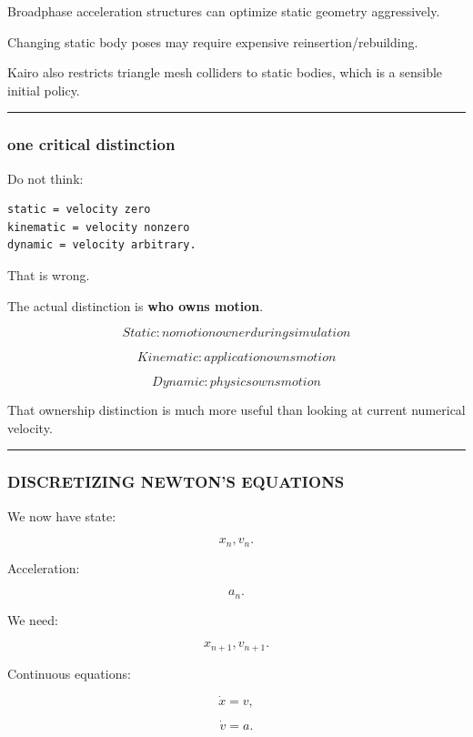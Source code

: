 Broadphase acceleration structures can optimize static geometry aggressively.

Changing static body poses may require expensive reinsertion/rebuilding.

Kairo also restricts triangle mesh colliders to static bodies, which is a sensible initial policy.

\begin{center}\rule{0.5\linewidth}{0.5pt}\end{center}

\subsubsection{one critical distinction}\label{one-critical-distinction}

Do not think:

\begin{verbatim}
static = velocity zero
kinematic = velocity nonzero
dynamic = velocity arbitrary.
\end{verbatim}

That is wrong.

The actual distinction is \textbf{who owns motion}.

\[
\boxed{
Static:
no motion owner during simulation
}
\]

\[
\boxed{
Kinematic:
application owns motion
}
\]

\[
\boxed{
Dynamic:
physics owns motion
}
\]

That ownership distinction is much more useful than looking at current numerical velocity.

\begin{center}\rule{0.5\linewidth}{0.5pt}\end{center}

\subsubsection{DISCRETIZING NEWTON'S EQUATIONS}\label{discretizing-newtons-equations}

We now have state:

\[
x_n,
v_n.
\]

Acceleration:

\[
a_n.
\]

We need:

\[
x_{n+1},
v_{n+1}.
\]

Continuous equations:

\[
\dot x=v,
\]

\[
\dot v=a.
\]

